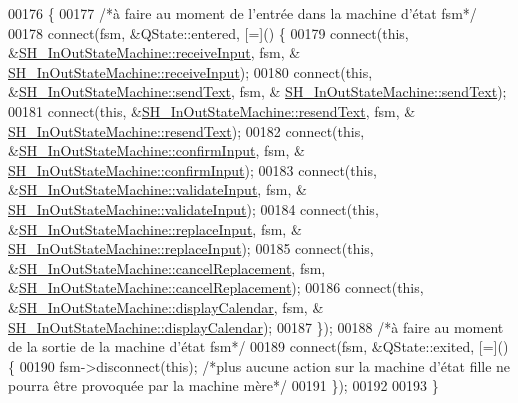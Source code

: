 \begin{DoxyCode}
00176 \{
00177     \textcolor{comment}{/*à faire au moment de l'entrée dans la machine d'état fsm*/}
00178     connect(fsm, &QState::entered, [=]() \{
00179         connect(\textcolor{keyword}{this}, &\hyperlink{classSH__InOutStateMachine_ab224e4a6ab99c15770bc63e1b8fdb771}{SH\_InOutStateMachine::receiveInput}, fsm, &
      \hyperlink{classSH__InOutStateMachine_ab224e4a6ab99c15770bc63e1b8fdb771}{SH\_InOutStateMachine::receiveInput});
00180         connect(\textcolor{keyword}{this}, &\hyperlink{classSH__InOutStateMachine_ae2cbbe3cd207158668dcb4838938c7ad}{SH\_InOutStateMachine::sendText}, fsm, &
      \hyperlink{classSH__InOutStateMachine_ae2cbbe3cd207158668dcb4838938c7ad}{SH\_InOutStateMachine::sendText});
00181         connect(\textcolor{keyword}{this}, &\hyperlink{classSH__InOutStateMachine_a526822c66b46aa0cd81ba4473fa5573f}{SH\_InOutStateMachine::resendText}, fsm, &
      \hyperlink{classSH__InOutStateMachine_a526822c66b46aa0cd81ba4473fa5573f}{SH\_InOutStateMachine::resendText});
00182         connect(\textcolor{keyword}{this}, &\hyperlink{classSH__InOutStateMachine_a0fb4c4d63ccb19df48f1e060d02d8ae3}{SH\_InOutStateMachine::confirmInput}, fsm, &
      \hyperlink{classSH__InOutStateMachine_a0fb4c4d63ccb19df48f1e060d02d8ae3}{SH\_InOutStateMachine::confirmInput});
00183         connect(\textcolor{keyword}{this}, &\hyperlink{classSH__InOutStateMachine_a5a5804bd32a04d25926f6e323b906887}{SH\_InOutStateMachine::validateInput}, fsm, &
      \hyperlink{classSH__InOutStateMachine_a5a5804bd32a04d25926f6e323b906887}{SH\_InOutStateMachine::validateInput});
00184         connect(\textcolor{keyword}{this}, &\hyperlink{classSH__InOutStateMachine_af5f82970faef3bca48a147863dba2ee1}{SH\_InOutStateMachine::replaceInput}, fsm, &
      \hyperlink{classSH__InOutStateMachine_af5f82970faef3bca48a147863dba2ee1}{SH\_InOutStateMachine::replaceInput});
00185         connect(\textcolor{keyword}{this}, &\hyperlink{classSH__InOutStateMachine_a67ce246a765ad91fef76f70ece12213f}{SH\_InOutStateMachine::cancelReplacement}, fsm,
       &\hyperlink{classSH__InOutStateMachine_a67ce246a765ad91fef76f70ece12213f}{SH\_InOutStateMachine::cancelReplacement});
00186         connect(\textcolor{keyword}{this}, &\hyperlink{classSH__InOutStateMachine_a0d241868828cbf9798233a8c74c69851}{SH\_InOutStateMachine::displayCalendar}, fsm, &
      \hyperlink{classSH__InOutStateMachine_a0d241868828cbf9798233a8c74c69851}{SH\_InOutStateMachine::displayCalendar});
00187     \});
00188     \textcolor{comment}{/*à faire au moment de la sortie de la machine d'état fsm*/}
00189     connect(fsm, &QState::exited, [=]() \{
00190         fsm->disconnect(\textcolor{keyword}{this}); \textcolor{comment}{/*plus aucune action sur la machine d'état fille ne pourra être provoquée
       par la machine mère*/}
00191     \});
00192 
00193 \}
\end{DoxyCode}


